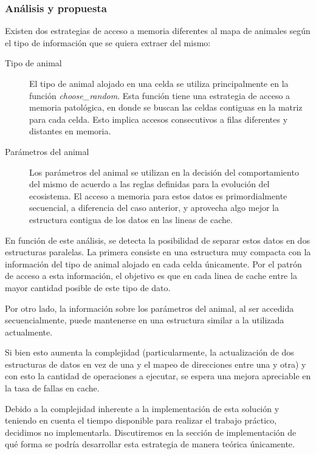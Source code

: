 \documentclass[a4paper,11pt]{article}
\begin{document}
\subsubsection{Análisis y propuesta}

Existen dos estrategias de acceso a memoria diferentes al mapa de animales
según el tipo de información que se quiera extraer del mismo:

\begin{description}

    \item[Tipo de animal] El tipo de animal alojado en una celda se utiliza
        principalmente en la función \textit{choose\_random}. Esta función
        tiene una estrategia de acceso a memoria patológica, en donde se buscan
        las celdas contiguas en la matriz para cada celda. Esto implica accesos
        consecutivos a filas diferentes y distantes en memoria.

    \item[Parámetros del animal] Los parámetros del animal se utilizan en la
        decisión del comportamiento del mismo de acuerdo a las reglas definidas
        para la evolución del ecosistema. El acceso a memoria para estos datos
        es primordialmente secuencial, a diferencia del caso anterior, y
        aprovecha algo mejor la estructura contigua de los datos en las lineas
        de cache.

\end{description}

En función de este análisis, se detecta la posibilidad de separar estos datos
en dos estructuras paralelas. La primera consiste en una estructura muy
compacta con la información del tipo de animal alojado en cada celda
únicamente. Por el patrón de acceso a esta información, el objetivo es que en
cada linea de cache entre la mayor cantidad posible de este tipo de dato.

Por otro lado, la información sobre los parámetros del animal, al ser accedida
secuencialmente, puede mantenerse en una estructura similar a la
utilizada actualmente.

Si bien esto aumenta la complejidad (particularmente, la actualización de dos
estructuras de datos en vez de una y el mapeo de direcciones entre una y otra)
y con esto la cantidad de operaciones a ejecutar, se espera una mejora
apreciable en la tasa de fallas en cache.

Debido a la complejidad inherente a la implementación de esta solución y
teniendo en cuenta el tiempo disponible para realizar el trabajo práctico,
decidimos no implementarla. Discutiremos en la sección de implementación de qué
forma se podría desarrollar esta estrategia de manera teórica únicamente.
\end{document}

